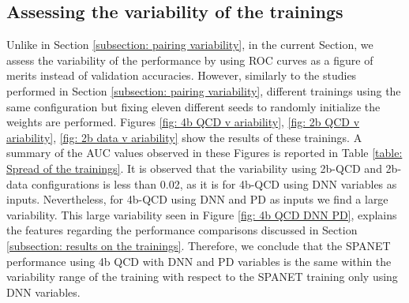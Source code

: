 \clearpage

\subsection{Assessing the variability of the trainings} \label{subsection: var of training S/B}

Unlike in Section \ref{subsection: pairing variability}, in the current Section, we assess the variability of the performance by using ROC curves as a figure of merits instead of validation accuracies. However, similarly to the studies performed in Section \ref{subsection: pairing variability}, different trainings using the same configuration but fixing eleven different seeds to randomly initialize the weights are performed. Figures \ref{fig: 4b QCD v ariability}, \ref{fig: 2b QCD v ariability}, \ref{fig: 2b data v ariability} show the results of these trainings. A summary of the AUC values observed in these Figures is reported in Table \ref{table: Spread of the trainings}. It is observed that the variability using 2b-QCD and 2b-data configurations is less than 0.02, as it is for 4b-QCD using DNN variables as inputs. Nevertheless, for 4b-QCD using DNN and PD as inputs we find a large variability. This large variability seen in Figure \ref{fig: 4b QCD DNN PD}, explains the features regarding the performance comparisons discussed in Section \ref{subsection: results on the trainings}. Therefore, we conclude that the SPANET performance using 4b QCD with DNN and PD variables is the same within the variability range of the training with respect to the SPANET training only using DNN variables.

